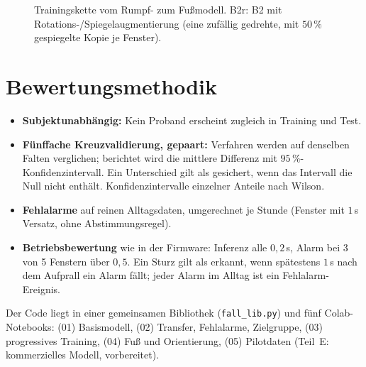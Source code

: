 \documentclass[11pt,a4paper,oneside,parskip=half,open=any,
               numbers=noenddot,listof=totoc,bibliography=totoc]{scrreprt}
\begin{document}
\begin{figure}[H]
\centering
{}
\caption{Trainingskette vom Rumpf- zum Fußmodell. B2r: B2 mit
Rotations-/Spiegelaugmentierung (eine zufällig gedrehte, mit $50\,\%$
gespiegelte Kopie je Fenster).}
\label{fig:kette}
\end{figure}

\section{Bewertungsmethodik}
\begin{itemize}\setlength\itemsep{1pt}
\item \textbf{Subjektunabhängig:} Kein Proband erscheint zugleich in
      Training und Test.
\item \textbf{Fünffache Kreuzvalidierung, gepaart:} Verfahren werden auf
      denselben Falten verglichen; berichtet wird die mittlere Differenz
      mit $95\,\%$-Konfidenzintervall. Ein Unterschied gilt als
      gesichert, wenn das Intervall die Null nicht enthält.
      Konfidenzintervalle einzelner Anteile nach Wilson.
\item \textbf{Fehlalarme} auf reinen Alltagsdaten, umgerechnet je Stunde
      (Fenster mit $1$\,s Versatz, ohne Abstimmungsregel).
\item \textbf{Betriebsbewertung} wie in der Firmware: Inferenz alle
      $0{,}2$\,s, Alarm bei 3 von 5 Fenstern über $0{,}5$. Ein Sturz gilt
      als erkannt, wenn spätestens $1$\,s nach dem Aufprall ein Alarm
      fällt; jeder Alarm im Alltag ist ein Fehlalarm-Ereignis.
\end{itemize}
Der Code liegt in einer gemeinsamen Bibliothek (\texttt{fall\_lib.py})
und fünf Colab-Notebooks: (01) Basismodell, (02) Transfer, Fehlalarme,
Zielgruppe, (03) progressives Training, (04) Fuß und Orientierung,
(05) Pilotdaten (Teil~E: kommerzielles Modell, vorbereitet).
\end{document}
